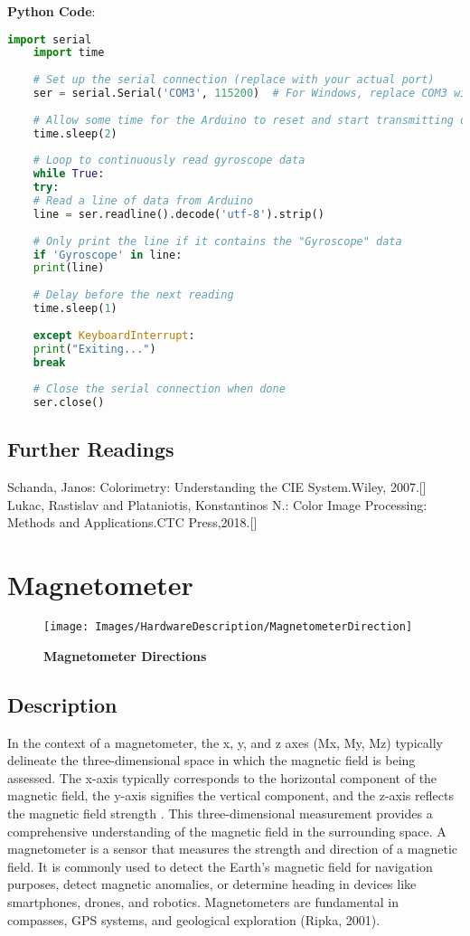 \textbf{Python Code}:
\begin{lstlisting}[language=Python ,style=pythonstyle ,caption={Python Code to Read and Test Gyroscope Data}, label={lst:python_gyroscope}]
	import serial
	import time
	
	# Set up the serial connection (replace with your actual port)
	ser = serial.Serial('COM3', 115200)  # For Windows, replace COM3 with your port, for Mac/Linux, it may be /dev/ttyACM0 or /dev/ttyUSB0
	
	# Allow some time for the Arduino to reset and start transmitting data
	time.sleep(2)
	
	# Loop to continuously read gyroscope data
	while True:
	try:
	# Read a line of data from Arduino
	line = ser.readline().decode('utf-8').strip()
	
	# Only print the line if it contains the "Gyroscope" data
	if 'Gyroscope' in line:
	print(line)
	
	# Delay before the next reading
	time.sleep(1)
	
	except KeyboardInterrupt:
	print("Exiting...")
	break
	
	# Close the serial connection when done
	ser.close()
\end{lstlisting}

\subsection{Further Readings}
Schanda, Janos: Colorimetry: Understanding the CIE System.Wiley, 2007.[\cite{Schanda:2007}]
Lukac, Rastislav and Plataniotis, Konstantinos N.: Color Image Processing:
Methods and Applications.CTC Press,2018.[\cite{Lukac:2018}]

\section{Magnetometer}
\begin{figure}[h!]\centering
	\texttt{[image: Images/HardwareDescription/MagnetometerDirection]}
	\caption{\textbf{Magnetometer Directions}}
	\label{fig:Magnetometer}
	\cite{Stm:2015}
\end{figure}
\subsection{Description}
In the context of a magnetometer, the x, y, and z axes (Mx, My, Mz) typically delineate the three-dimensional space in which the magnetic field is being assessed. The x-axis typically corresponds to the horizontal component of the magnetic field, the y-axis signifies the vertical component, and the z-axis reflects the magnetic field strength \cite{Kostiainen:2023}. This three-dimensional measurement provides a comprehensive understanding of the magnetic field in the surrounding space.
A magnetometer is a sensor that measures the strength and direction of a magnetic field. It is commonly used to detect the Earth's magnetic field for navigation purposes, detect magnetic anomalies, or determine heading in devices like smartphones, drones, and robotics. Magnetometers are fundamental in compasses, GPS systems, and geological exploration (Ripka, 2001).
